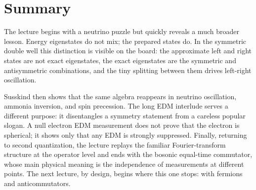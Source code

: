 \section{Summary}

The lecture begins with a neutrino puzzle but quickly reveals a much broader lesson. Energy eigenstates do not mix; the prepared states do. In the symmetric double well this distinction is visible on the board: the approximate left and right states are not exact eigenstates, the exact eigenstates are the symmetric and antisymmetric combinations, and the tiny splitting between them drives left-right oscillation.

Susskind then shows that the same algebra reappears in neutrino oscillation, ammonia inversion, and spin precession. The long EDM interlude serves a different purpose: it disentangles a symmetry statement from a careless popular slogan. A null electron EDM measurement does not prove that the electron is spherical; it shows only that any EDM is strongly suppressed. Finally, returning to second quantization, the lecture replays the familiar Fourier-transform structure at the operator level and ends with the bosonic equal-time commutator, whose main physical meaning is the independence of measurements at different points. The next lecture, by design, begins where this one stops: with fermions and anticommutators.